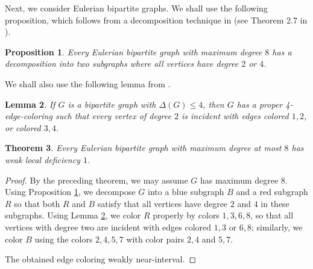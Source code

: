 \documentclass[12pt]{article}
\theoremstyle{plain}
\newtheorem{theorem}{Theorem}[section]
\newtheorem{lemma}[theorem]{Lemma}
\newtheorem{proposition}[theorem]{Proposition}
\theoremstyle{definition}
\numberwithin{equation}{section}
\begin{document}
	Next, we consider Eulerian bipartite graphs. 
	We shall use the following proposition, which follows from a decomposition technique
	in \cite{AsratianCasselgrenPetrosyan2} (see Theorem 2.7 in \cite{AsratianCasselgrenPetrosyan2}).

\begin{proposition}
\label{prop:decomp}
	Every Eulerian bipartite graph with maximum degree $8$ has a decomposition
	into two subgraphs where all vertices have degree $2$ or $4$.
\end{proposition}

We shall also use the following lemma from \cite{CasselgrenPetrosyan}.

\begin{lemma}
\label{lem:4}
	If $G$ is a bipartite graph with $\Delta(G) \leq 4$, then $G$ 
	has a proper 4-edge-coloring such that every vertex of degree $2$
	is incident with edges colored $1,2$, or colored $3,4$.
\end{lemma}




\begin{theorem}
\label{th:WeakEul}
	Every Eulerian bipartite graph with maximum degree at most $8$ has weak local deficiency $1$.
\end{theorem}

\begin{proof}
	By the preceding theorem, we may assume $G$ has maximum degree $8$.
	Using Proposition \ref{prop:decomp}, we
	decompose $G$ into a blue subgraph $B$ and a red subgraph $R$ so that 
	both $R$ and $B$ satisfy that all vertices have degree $2$ and $4$ in these subgraphs.
	Using Lemma \ref{lem:4}, we color $R$ properly by colors $1,3, 6,8$,
	so that all vertices with degree two are incident with edges colored $1,3$ or $6,8$; 
 	similarly, we color $B$ using the colors $2,4, 5,7$ with color pairs $2,4$ and $5,7$.

	The obtained edge coloring weakly near-interval.
\end{proof}
\end{document}
